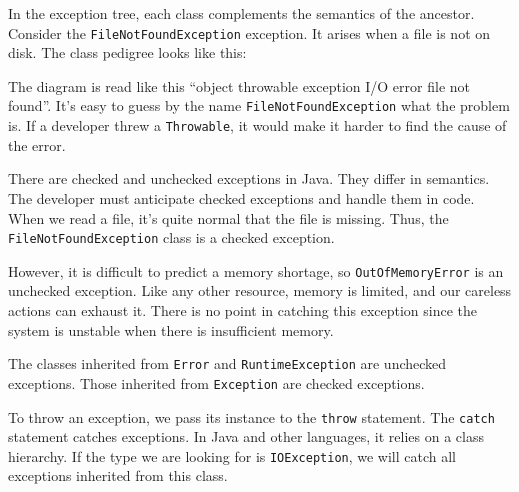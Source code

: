 In the exception tree, each class complements the semantics of the ancestor. Consider the \verb|FileNotFoundException| exception. It arises when a file is not on disk. The class pedigree looks like this:

\linegap

\ifx\DEVICETYPE\MOBILE


\else


\fi

\linegap

The diagram is read like this ``object \arr throwable \arr exception \arr I/O error \arr file not found''. It's easy to guess by the name \verb|FileNotFoundException| what the problem is. If a developer threw a \verb|Throwable|, it would make it harder to find the cause of the error.

There are checked and unchecked exceptions in Java. They differ in semantics. The developer must anticipate checked exceptions and handle them in code. When we read a file, it's quite normal that the file is missing. Thus, the \verb|FileNotFoundException| class is a checked exception.


\label{exc-hierarchy}

However, it is difficult to predict a memory shortage, so \verb|OutOfMemoryError| is an unchecked exception. Like any other resource, memory is limited, and our careless actions can exhaust it. There is no point in catching this exception since the system is unstable when there is insufficient memory.


The classes inherited from \verb|Error| and \texttt{Runtime\-Exception} are unchecked exceptions. Those inherited from \verb|Exception| are checked exceptions.


To throw an exception, we pass its instance to the \verb|throw| statement. The \verb|catch| statement catches exceptions. In Java and other languages, it relies on a class hierarchy. If the type we are looking for is \verb|IOException|, we will catch all exceptions inherited from this class.

